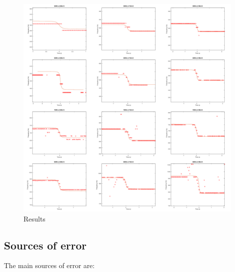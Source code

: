 \documentclass[12pt]{article}
\begin{document}
\begin{figure}[H]
	\centering
	\includegraphics[width=7in]{resultsvert}
	\caption{Results}
	\label{fig:results}
\end{figure}

\subsection{Sources of error}

The main sources of error are:
\end{document}
